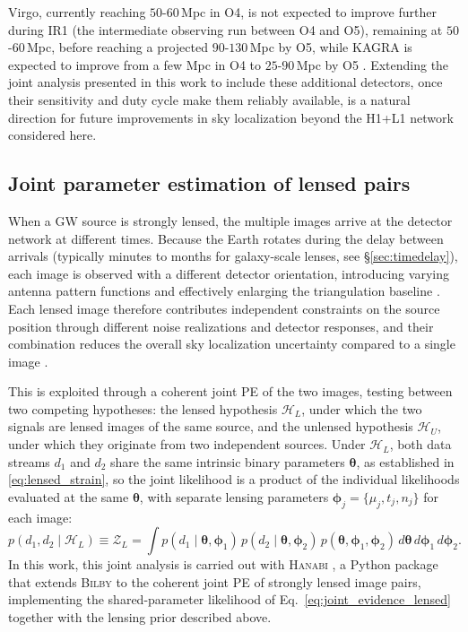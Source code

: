 Virgo, currently reaching $50$-$60$\,Mpc in O4, is not
expected to improve further during IR1 (the intermediate
observing run between O4 and O5), remaining at $50$-$60$\,Mpc, before reaching a projected $90$-$130$\,Mpc by O5, while KAGRA is expected to improve from a few Mpc in O4 to $25$-$90$\,Mpc by O5 \cite{LVK_observing_plan}. Extending
the joint analysis presented in this work to include these 
additional detectors, once their sensitivity and duty cycle 
make them reliably available, is a natural direction for 
future improvements in sky localization beyond the H1+L1 
network considered here.


\subsection{Joint parameter estimation of lensed pairs}
\label{sec:joint_PE_skyloc}

When a GW source is strongly lensed, the multiple images 
arrive at the detector network at different times. Because 
the Earth rotates during the delay between arrivals 
(typically minutes to months for galaxy-scale lenses, 
see \S\ref{sec:timedelay}), each image is observed with 
a different detector orientation, introducing varying 
antenna pattern functions and effectively enlarging the 
triangulation baseline \cite{Hannuksela_skyloc}. Each 
lensed image therefore contributes independent 
constraints on the source position through different 
noise realizations and detector responses, and their 
combination reduces the overall sky localization 
uncertainty compared to a single image 
\cite{hubble_constant_lensing}.

This is exploited through a coherent joint PE of the two images, testing between two competing hypotheses: the lensed hypothesis $\mathcal{H}_L$, under which the two signals are lensed images of the same source, and the unlensed hypothesis $\mathcal{H}_U$, under which they originate from two independent sources. Under $\mathcal{H}_L$, both data streams $d_1$ and $d_2$ share the same intrinsic binary parameters $\boldsymbol{\theta}$, as established in 
\eqref{eq:lensed_strain}, so the joint likelihood is 
a product of the individual likelihoods evaluated at 
the same $\boldsymbol{\theta}$, with separate lensing 
parameters $\boldsymbol{\phi}_j = \{\mu_j, t_j, n_j\}$ 
for each image:
\begin{equation}
    p(d_1, d_2 \mid \mathcal{H}_L) \equiv \mathcal{Z}_L =
    \int p(d_1 \mid \boldsymbol{\theta}, \boldsymbol{\phi}_1)\,
    p(d_2 \mid \boldsymbol{\theta}, \boldsymbol{\phi}_2)\,
    p(\boldsymbol{\theta}, \boldsymbol{\phi}_1, \boldsymbol{\phi}_2)\,
    d\boldsymbol{\theta}\, d\boldsymbol{\phi}_1\, 
    d\boldsymbol{\phi}_2.
    \label{eq:joint_evidence_lensed}
\end{equation}
In this work, this joint analysis is carried out with \textsc{Hanabi} \cite{PE_lensing_bayes}, a Python package that extends \textsc{Bilby} to the coherent joint PE of strongly lensed image pairs, implementing the shared-parameter likelihood of Eq.~\eqref{eq:joint_evidence_lensed} together with the lensing prior described above.

